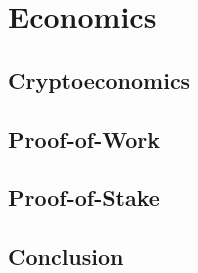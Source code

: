 \chapter{Economics}
\label{ch:economics}

\section{Cryptoeconomics}

\section{Proof-of-Work}

\section{Proof-of-Stake}

\section{Conclusion}
